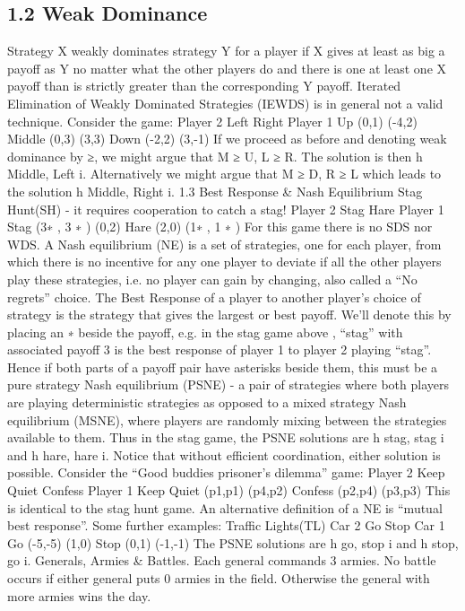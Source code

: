 \subsection{1.2 Weak Dominance}
Strategy X weakly dominates strategy Y for a player if X gives at least as big a payoff as Y
no matter what the other players do and there is one at least one X payoff than is strictly
greater than the corresponding Y payoff.
Iterated Elimination of Weakly Dominated Strategies (IEWDS) is in general not
a valid technique. Consider the game:
Player 2
Left Right
Player 1
Up (0,1) (-4,2)
Middle (0,3) (3,3)
Down (-2,2) (3,-1)
If we proceed as before and denoting weak dominance by ≥, we might argue that M ≥
U, L ≥ R. The solution is then h Middle, Left i. Alternatively we might argue that M ≥
D, R ≥ L which leads to the solution h Middle, Right i.
1.3 Best Response & Nash Equilibrium
Stag Hunt(SH) - it requires cooperation to catch a stag!
Player 2
Stag Hare
Player 1 Stag (3∗
, 3
∗
) (0,2)
Hare (2,0) (1∗
, 1
∗
)
For this game there is no SDS nor WDS.
A Nash equilibrium (NE) is a set of strategies, one for each player, from which there
is no incentive for any one player to deviate if all the other players play these strategies,
i.e. no player can gain by changing, also called a “No regrets” choice. The Best Response
of a player to another player’s choice of strategy is the strategy that gives the largest or
best payoff. We’ll denote this by placing an ∗ beside the payoff, e.g. in the stag game
above , “stag” with associated payoff 3 is the best response of player 1 to player 2 playing
“stag”. Hence if both parts of a payoff pair have asterisks beside them, this must be a pure
strategy Nash equilibrium (PSNE) - a pair of strategies where both players are playing
deterministic strategies as opposed to a mixed strategy Nash equilibrium (MSNE), where
players are randomly mixing between the strategies available to them.
Thus in the stag game, the PSNE solutions are h stag, stag i and h hare, hare i. Notice
that without efficient coordination, either solution is possible.
Consider the “Good buddies prisoner’s dilemma” game:
Player 2
Keep Quiet Confess
Player 1 Keep Quiet (p1,p1) (p4,p2)
Confess (p2,p4) (p3,p3)
This is identical to the stag hunt game.
An alternative definition of a NE is “mutual best response”. Some further examples:
Traffic Lights(TL)
Car 2
Go Stop
Car 1 Go (-5,-5) (1,0)
Stop (0,1) (-1,-1)
The PSNE solutions are h go, stop i and h stop, go i.
Generals, Armies & Battles. Each general commands 3 armies. No battle occurs if either
general puts 0 armies in the field. Otherwise the general with more armies wins the day.
